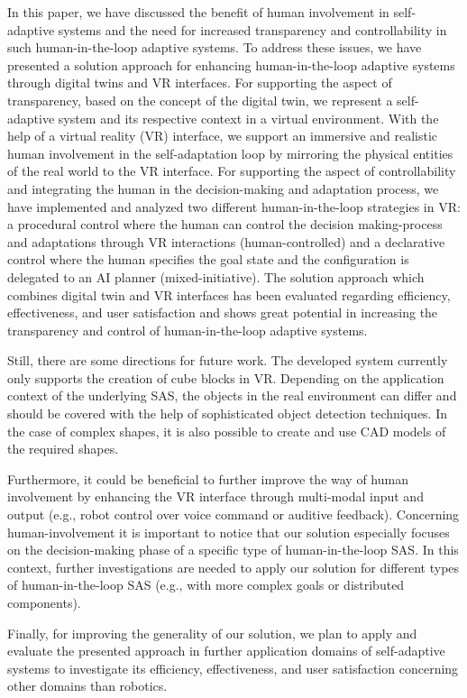 \documentclass[10pt, conference]{IEEEtran}
\begin{document}
In this paper, we have discussed the benefit of human involvement in self-adaptive systems and the need for increased transparency and controllability in such human-in-the-loop adaptive systems. To address these issues, we have presented a solution approach for enhancing human-in-the-loop adaptive systems through digital twins and VR interfaces. For supporting the aspect of transparency, based on the concept of the digital twin, we represent a self-adaptive system and its respective context in a virtual environment. With the help of a virtual reality (VR) interface, we support an immersive and realistic human involvement in the self-adaptation loop by mirroring the physical entities of the real world to the VR interface. For supporting the aspect of controllability and integrating the human in the decision-making and adaptation process, we have implemented and analyzed two different human-in-the-loop strategies in VR: a procedural control where the human can control the decision making-process and adaptations through VR interactions (human-controlled) and a declarative control where the human specifies the goal state and the configuration is delegated to an AI planner (mixed-initiative). The solution approach which combines digital twin and VR interfaces has been evaluated regarding efficiency, effectiveness, and user satisfaction and shows great potential in increasing the transparency and control of human-in-the-loop adaptive systems. 

Still, there are some directions for future work. The developed system currently only supports the creation of cube blocks in VR. Depending on the application context of the underlying SAS, the objects in the real environment can differ and should be covered with the help of sophisticated object detection techniques. In the case of complex shapes, it is also possible to create and use CAD models of the required shapes. 

Furthermore, it could be beneficial to further improve the way of human involvement by enhancing the VR interface through multi-modal input and output (e.g., robot control over voice command or auditive feedback). Concerning human-involvement it is important to notice that our solution especially focuses on the decision-making phase of a specific type of human-in-the-loop SAS. In this context, further investigations are needed to apply our solution for different types of human-in-the-loop SAS (e.g., with more complex goals or distributed components).    

Finally, for improving the generality of our solution, we plan to apply and evaluate the presented approach in further application domains of self-adaptive systems to investigate its efficiency, effectiveness, and user satisfaction concerning other domains than robotics. 
\end{document}

